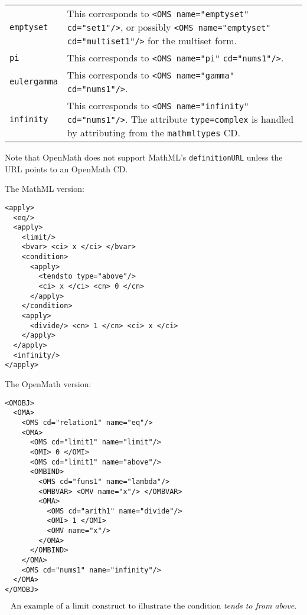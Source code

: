 \documentclass[twoside,11pt]{article}
\begin{document}
\begin{longtable}{
        >{\raggedright\let\\=\tabularnewline}p{2in}
        >{\raggedright\let\\=\tabularnewline}p{3in}}
\verb+emptyset+&This corresponds to
\verb+<OMS name="emptyset"+ \verb+cd="set1"/>+, or possibly 
\verb+<OMS name="emptyset"+ \verb+cd="multiset1"/>+ for the multiset form.\\
\verb+pi+&This corresponds to
\verb+<OMS name="pi"+ \verb+cd="nums1"/>+.\\
\verb+eulergamma+&This corresponds to
\verb+<OMS name="gamma"+ \verb+cd="nums1"/>+.\\
\verb+infinity+&This corresponds to
\verb+<OMS name="infinity"+ \verb+cd="nums1"/>+. The attribute
\verb+type=complex+ is handled by attributing from the
\verb+mathmltypes+ CD.\\
\end{longtable}

Note that OpenMath does not support MathML's \verb+definitionURL+
unless the URL points to an OpenMath CD.\\
\begin{center}
\begin{mybox}{4.5in}
The MathML version:
\begin{verbatim}<apply>
  <eq/>
  <apply>
    <limit/>
    <bvar> <ci> x </ci> </bvar>
    <condition>
      <apply>
        <tendsto type="above"/>
        <ci> x </ci> <cn> 0 </cn>
      </apply>
    </condition>
    <apply>
      <divide/> <cn> 1 </cn> <ci> x </ci>
    </apply>
  </apply>
  <infinity/>
</apply>
\end{verbatim}

The OpenMath version:
\begin{verbatim}
<OMOBJ>
  <OMA>
    <OMS cd="relation1" name="eq"/>
    <OMA>
      <OMS cd="limit1" name="limit"/>
      <OMI> 0 </OMI>
      <OMS cd="limit1" name="above"/>
      <OMBIND>
        <OMS cd="funs1" name="lambda"/>
        <OMBVAR> <OMV name="x"/> </OMBVAR>
        <OMA>
          <OMS cd="arith1" name="divide"/>
          <OMI> 1 </OMI>
          <OMV name="x"/>
        </OMA>
      </OMBIND>
    </OMA>
    <OMS cd="nums1" name="infinity"/>
  </OMA>
</OMOBJ>
\end{verbatim}
\end{mybox}
\end{center}
\begin{equation}\label{limit}
\hbox{An example of a limit construct to illustrate the condition
{\em tends to from above}.}
\end{equation}
\end{document}
